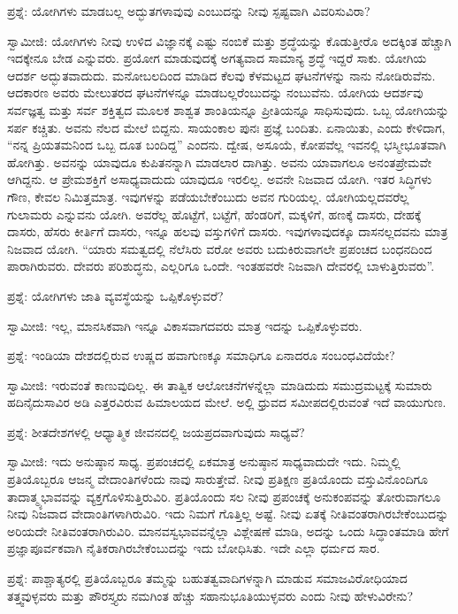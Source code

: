 ಪ್ರಶ್ನೆ: ಯೋಗಿಗಳು ಮಾಡಬಲ್ಲ ಅದ್ಭುತಗಳಾವುವು ಎಂಬುದನ್ನು ನೀವು ಸ್ಪಷ್ಟವಾಗಿ ವಿವರಿಸುವಿರಾ?

ಸ್ವಾಮೀಜಿ: ಯೋಗಿಗಳು ನೀವು ಉಳಿದ ವಿಜ್ಞಾನಕ್ಕೆ ಎಷ್ಟು ನಂಬಿಕೆ ಮತ್ತು ಶ್ರದ್ಧೆಯನ್ನು ಕೊಡುತ್ತೀರೊ ಅದಕ್ಕಿಂತ ಹೆಚ್ಚಾಗಿ ಇದಕ್ಕೇನೂ ಬೇಡ ಎನ್ನುವರು. ಪ್ರಯೋಗ ಮಾಡುವುದಕ್ಕೆ ಅಗತ್ಯವಾದ ಸಾಮಾನ್ಯ ಶ್ರದ್ಧೆ ಇದ್ದರೆ ಸಾಕು. ಯೋಗಿಯ ಆದರ್ಶ ಅದ್ಭುತವಾದುದು. ಮನೋಬಲದಿಂದ ಮಾಡಿದ ಕೆಲವು ಕೆಳಮಟ್ಟದ ಘಟನೆಗಳನ್ನು ನಾನು ನೋಡಿರುವೆನು. ಆದಕಾರಣ ಅವರು ಮೇಲುತರದ ಘಟನೆಗಳನ್ನೂ ಮಾಡಬಲ್ಲರೆಂಬುದನ್ನು ನಂಬುವೆನು. ಯೋಗಿಯ ಆದರ್ಶವು ಸರ್ವಜ್ಞತ್ವ ಮತ್ತು ಸರ್ವ ಶಕ್ತಿತ್ವದ ಮೂಲಕ ಶಾಶ್ವತ ಶಾಂತಿಯನ್ನೂ ಪ್ರೀತಿಯನ್ನೂ ಸಾಧಿಸುವುದು. ಒಬ್ಬ ಯೋಗಿಯನ್ನು ಸರ್ಪ ಕಚ್ಚಿತು. ಅವನು ನೆಲದ ಮೇಲೆ ಬಿದ್ದನು. ಸಾಯಂಕಾಲ ಪುನಃ ಪ್ರಜ್ಞೆ ಬಂದಿತು. ಏನಾಯಿತು, ಎಂದು ಕೇಳಿದಾಗ, “ನನ್ನ ಪ್ರಿಯತಮನಿಂದ ಒಬ್ಬ ದೂತ ಬಂದಿದ್ದ” ಎಂದನು. ದ್ವೇಷ, ಅಸೂಯೆ, ಕೋಪವೆಲ್ಲ ಇವನಲ್ಲಿ ಭಸ್ಮೀಭೂತವಾಗಿ ಹೋಗಿತ್ತು. ಅವನನ್ನು ಯಾವುದೂ ಕುಪಿತನನ್ನಾಗಿ ಮಾಡಲಾರ ದಾಗಿತ್ತು. ಅವನು ಯಾವಾಗಲೂ ಅನಂತಪ್ರೇಮವೇ ಆಗಿದ್ದನು. ಆ ಪ್ರೇಮಶಕ್ತಿಗೆ ಅಸಾಧ್ಯವಾದುದು ಯಾವುದೂ ಇರಲಿಲ್ಲ. ಅವನೇ ನಿಜವಾದ ಯೋಗಿ. ಇತರ ಸಿದ್ಧಿಗಳು ಗೌಣ, ಕೇವಲ ನಿಮಿತ್ತಮಾತ್ರ. ಇವುಗಳನ್ನು ಪಡೆಯಬೇಕೆಂಬುದು ಅವನ ಗುರಿಯಲ್ಲ. ಯೋಗಿಯಲ್ಲದವರೆಲ್ಲ ಗುಲಾಮರು ಎನ್ನುವನು ಯೋಗಿ. ಅವರೆಲ್ಲ ಹೊಟ್ಟೆಗೆ, ಬಟ್ಟೆಗೆ, ಹೆಂಡರಿಗೆ, ಮಕ್ಕಳಿಗೆ, ಹಣಕ್ಕೆ ದಾಸರು, ದೇಹಕ್ಕೆ ದಾಸರು, ಹೆಸರು ಕೀರ್ತಿಗೆ ದಾಸರು, ಇನ್ನೂ ಹಲವು ವಸ್ತುಗಳಿಗೆ ದಾಸರು. ಇವುಗಳಾವುದಕ್ಕೂ ದಾಸನಲ್ಲದವನು ಮಾತ್ರ ನಿಜವಾದ ಯೋಗಿ. “ಯಾರು ಸಮತ್ವದಲ್ಲಿ ನೆಲೆಸಿರು ವರೋ ಅವರು ಬದುಕಿರುವಾಗಲೇ ಪ್ರಪಂಚದ ಬಂಧನದಿಂದ ಪಾರಾಗಿರುವರು. ದೇವರು ಪರಿಶುದ್ಧನು, ಎಲ್ಲರಿಗೂ ಒಂದೇ. ಇಂತಹವರೇ ನಿಜವಾಗಿ ದೇವರಲ್ಲಿ ಬಾಳುತ್ತಿರುವರು”.

ಪ್ರಶ್ನೆ: ಯೋಗಿಗಳು ಜಾತಿ ವ್ಯವಸ್ಥೆಯನ್ನು ಒಪ್ಪಿಕೊಳ್ಳುವರೆ?

ಸ್ವಾಮೀಜಿ: ಇಲ್ಲ, ಮಾನಸಿಕವಾಗಿ ಇನ್ನೂ ವಿಕಾಸವಾಗದವರು ಮಾತ್ರ ಇದನ್ನು ಒಪ್ಪಿಕೊಳ್ಳುವರು.

ಪ್ರಶ್ನೆ: ಇಂಡಿಯಾ ದೇಶದಲ್ಲಿರುವ ಉಷ್ಣದ ಹವಾಗುಣಕ್ಕೂ ಸಮಾಧಿಗೂ ಏನಾದರೂ ಸಂಬಂಧವಿದೆಯೇ?

ಸ್ವಾಮೀಜಿ: ಇರುವಂತೆ ಕಾಣುವುದಿಲ್ಲ. ಈ ತಾತ್ವಿಕ ಆಲೋಚನೆಗಳನ್ನೆಲ್ಲಾ ಮಾಡಿದುದು ಸಮುದ್ರಮಟ್ಟಕ್ಕೆ ಸುಮಾರು ಹದಿನೈದುಸಾವಿರ ಅಡಿ ಎತ್ತರವಿರುವ ಹಿಮಾಲಯದ ಮೇಲೆ. ಅಲ್ಲಿ ಧ್ರುವದ ಸಮೀಪದಲ್ಲಿರುವಂತೆ ಇದೆ ವಾಯುಗುಣ.

ಪ್ರಶ್ನೆ: ಶೀತದೇಶಗಳಲ್ಲಿ ಆಧ್ಯಾತ್ಮಿಕ ಜೀವನದಲ್ಲಿ ಜಯಪ್ರದವಾಗುವುದು ಸಾಧ್ಯವೆ?

ಸ್ವಾಮೀಜಿ: ಇದು ಅನುಷ್ಠಾನ ಸಾಧ್ಯ. ಪ್ರಪಂಚದಲ್ಲಿ ಏಕಮಾತ್ರ ಅನುಷ್ಠಾನ ಸಾಧ್ಯವಾದುದೇ ಇದು. ನಿಮ್ಮಲ್ಲಿ ಪ್ರತಿಯೊಬ್ಬರೂ ಆಜನ್ಮ ವೇದಾಂತಿಗಳೆಂದು ನಾವು ಸಾರುತ್ತೇವೆ. ನೀವು ಪ್ರತಿಕ್ಷಣ ಪ್ರತಿಯೊಂದು ವಸ್ತುವಿನೊಂದಿಗೂ ತಾದಾತ್ಮ್ಯಭಾವವನ್ನು ವ್ಯಕ್ತಗೊಳಿಸುತ್ತಿರುವಿರಿ. ಪ್ರತಿಯೊಂದು ಸಲ ನೀವು ಪ್ರಪಂಚಕ್ಕೆ ಅನುಕಂಪವನ್ನು ತೋರುವಾಗಲೂ ನೀವು ನಿಜವಾದ ವೇದಾಂತಿಗಳಾಗಿರುವಿರಿ. ಇದು ನಿಮಗೆ ಗೊತ್ತಿಲ್ಲ ಅಷ್ಟೆ. ನೀವು ಏತಕ್ಕೆ ನೀತಿವಂತರಾಗಿರಬೇಕೆಂಬುದನ್ನು ಅರಿಯದೇ ನೀತಿವಂತರಾಗಿರುವಿರಿ. ಮಾನವಸ್ವಭಾವವನ್ನೆಲ್ಲಾ ವಿಶ್ಲೇಷಣೆ ಮಾಡಿ, ಅದನ್ನು ಒಂದು ಸಿದ್ಧಾಂತಮಾಡಿ ಹೇಗೆ ಪ್ರಜ್ಞಾಪೂರ್ವಕವಾಗಿ ನೈತಿಕರಾಗಿರಬೇಕೆಂಬುದನ್ನು ಇದು ಬೋಧಿಸಿತು. ಇದೇ ಎಲ್ಲಾ ಧರ್ಮದ ಸಾರ.

ಪ್ರಶ್ನೆ: ಪಾಶ್ಚಾತ್ಯರಲ್ಲಿ ಪ್ರತಿಯೊಬ್ಬರೂ ತಮ್ಮನ್ನು ಬಹುತತ್ವವಾದಿಗಳನ್ನಾಗಿ ಮಾಡುವ ಸಮಾಜವಿರೋಧಿಯಾದ ತತ್ತ್ವವುಳ್ಳವರು ಮತ್ತು ಪೌರಸ್ತ್ಯರು ನಮಗಿಂತ ಹೆಚ್ಚು ಸಹಾನುಭೂತಿಯುಳ್ಳವರು ಎಂದು ನೀವು ಹೇಳುವಿರೇನು?

